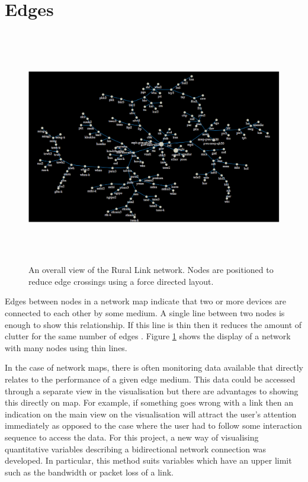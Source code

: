 \documentclass[11pt, a4paper]{report}
\begin{document}
\section{Edges}
\label{sec:edges.vis}

\begin{figure}[h]
\centering
\includegraphics[width=170mm,height=102.54mm]{assets/edges1-0.eps}
\caption{An overall view of the Rural Link network. Nodes are positioned to
reduce edge crossings using a force directed layout.}
\label{fig:edges1.0}
\end{figure}

Edges between nodes in a network map indicate that two or more devices are
connected to each other by some medium. A single line between two nodes is
enough to show this relationship. If this line is thin then it reduces the
amount of clutter for the same number of edges \cite{Tufte_2007}. Figure
\ref{fig:edges1.0} shows the display of a network with many nodes using thin
lines.

In the case of network maps, there is often monitoring data available that
directly relates to the performance of a given edge medium. This data could be
accessed through a separate view in the visualisation but there are advantages
to showing this directly on map. For example, if something goes wrong with a
link then an indication on the main view on the visualisation will attract the
user's attention immediately as opposed to the case where the user had to follow
some interaction sequence to access the data. For this project, a new way of
visualising quantitative variables describing a bidirectional network connection
was developed. In particular, this method suits variables which have an upper
limit such as the bandwidth or packet loss of a link.
\end{document}
